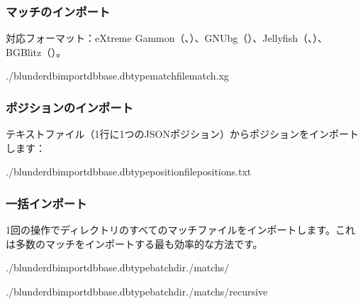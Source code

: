 \documentclass[letterpaper,10pt,dvipdfmx]{sphinxmanual}
\begin{document}
\subsubsection{マッチのインポート}
\label{\detokenize{cli:import-d-un-match}}
\sphinxAtStartPar
対応フォーマット：eXtreme Gammon（、）、GNUbg（）、Jellyfish（、）、BGBlitz（）。

\begin{sphinxVerbatim}[commandchars=\\\{\}]
./blunderdbimport\PYGZhy{}\PYGZhy{}dbbase.db\PYGZhy{}\PYGZhy{}typematch\PYGZhy{}\PYGZhy{}filematch.xg
\end{sphinxVerbatim}


\subsubsection{ポジションのインポート}
\label{\detokenize{cli:import-de-positions}}
\sphinxAtStartPar
テキストファイル（1行に1つのJSONポジション）からポジションをインポートします：

\begin{sphinxVerbatim}[commandchars=\\\{\}]
./blunderdbimport\PYGZhy{}\PYGZhy{}dbbase.db\PYGZhy{}\PYGZhy{}typeposition\PYGZhy{}\PYGZhy{}filepositions.txt
\end{sphinxVerbatim}


\subsubsection{一括インポート}
\label{\detokenize{cli:import-par-lot}}
\sphinxAtStartPar
1回の操作でディレクトリのすべてのマッチファイルをインポートします。これは多数のマッチをインポートする最も効率的な方法です。

\begin{sphinxVerbatim}[commandchars=\\\{\}]
./blunderdbimport\PYGZhy{}\PYGZhy{}dbbase.db\PYGZhy{}\PYGZhy{}typebatch\PYGZhy{}\PYGZhy{}dir./matchs/

./blunderdbimport\PYGZhy{}\PYGZhy{}dbbase.db\PYGZhy{}\PYGZhy{}typebatch\PYGZhy{}\PYGZhy{}dir./matchs/\PYGZhy{}\PYGZhy{}recursive
\end{sphinxVerbatim}
\end{document}

